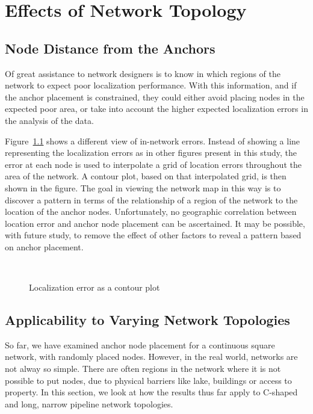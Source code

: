 \chapter{Effects of Network Topology}

\section{Node Distance from the Anchors}

Of great assistance to network designers is to know in which regions of the network to expect poor localization performance.  With this information, and if the anchor placement is constrained, they could either avoid placing nodes in the expected poor area, or take into account the higher expected localization errors in the analysis of the data.

Figure~\ref{fig:AS6goodcontour} shows a different view of in-network errors. Instead of showing a line representing the localization errors as in other figures present in this study, the error at each node is used to interpolate a grid of location errors throughout the area of the network.  A contour plot, based on that interpolated grid, is then shown in the figure.  The goal in viewing the network map in this way is to discover a pattern in terms of the relationship of a region of the network to the location of the anchor nodes.  Unfortunately, no geographic correlation between location error and anchor node placement can be ascertained.  It may be possible, with future study, to remove the effect of other factors to reveal a pattern based on anchor placement.

\begin{figure}
  \centering
	\\
	\caption{Localization error as a contour plot}
	\label{fig:AS6goodcontour}
\end{figure}

\section{Applicability to Varying Network Topologies}

So far, we have examined anchor node placement for a continuous square network, with randomly placed nodes.  However, in the real world, networks are not alway so simple.  There are often regions in the network where it is not possible to put nodes, due to physical barriers like lake, buildings or access to property.  In this section, we look at how the results thus far apply to C-shaped and long, narrow pipeline network topologies.

